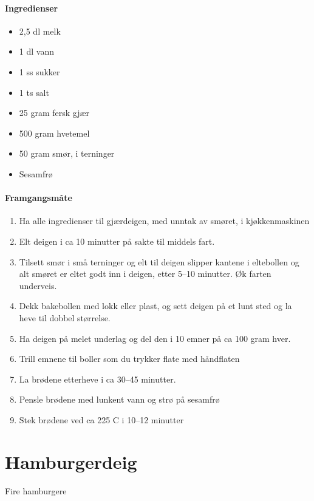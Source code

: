 \documentclass[12pt,a4paper]{book}
\begin{document}
\paragraph{Ingredienser}
\begin{itemize}[noitemsep]
		\item 2,5 dl melk
		\item 1 dl vann
		\item 1 ss sukker
		\item 1 ts salt
		\item 25 gram fersk gjær
		\item 500 gram hvetemel
		\item 50 gram smør, i terninger
		\item Sesamfrø
\end{itemize}

\paragraph{Framgangsmåte}
\begin{enumerate}[noitemsep]
	\item Ha alle ingredienser til gjærdeigen, med unntak av smøret, i kjøkkenmaskinen
	\item Elt deigen i ca 10 minutter på sakte til middels fart.
	\item Tilsett smør i små terninger og elt til deigen slipper kantene i eltebollen og alt smøret er eltet godt inn i deigen, etter 5--10 minutter. Øk farten underveis.
	\item Dekk bakebollen med lokk eller plast, og sett deigen på et lunt sted og la heve til dobbel størrelse.
	\item Ha deigen på melet underlag og del den i 10 emner på ca 100 gram hver.
	\item Trill emnene til boller som du trykker flate med håndflaten
	\item La brødene etterheve i ca 30--45 minutter.
	\item Pensle brødene med lunkent vann og strø på sesamfrø
	\item Stek brødene ved ca 225 \degree C i 10--12 minutter
\end{enumerate}
\clearpage{}
\clearpage{}\section{﻿Hamburgerdeig}
Fire hamburgere
\end{document}
